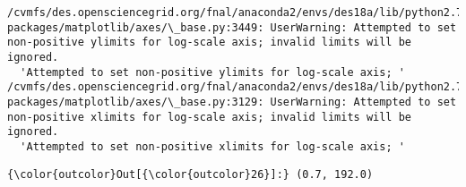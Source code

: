 \documentclass[11pt]{article}
\begin{document}
    \begin{Verbatim}[commandchars=\\\{\}]
/cvmfs/des.opensciencegrid.org/fnal/anaconda2/envs/des18a/lib/python2.7/site-packages/matplotlib/axes/\_base.py:3449: UserWarning: Attempted to set non-positive ylimits for log-scale axis; invalid limits will be ignored.
  'Attempted to set non-positive ylimits for log-scale axis; '
/cvmfs/des.opensciencegrid.org/fnal/anaconda2/envs/des18a/lib/python2.7/site-packages/matplotlib/axes/\_base.py:3129: UserWarning: Attempted to set non-positive xlimits for log-scale axis; invalid limits will be ignored.
  'Attempted to set non-positive xlimits for log-scale axis; '

    \end{Verbatim}

\begin{Verbatim}[commandchars=\\\{\}]
{\color{outcolor}Out[{\color{outcolor}26}]:} (0.7, 192.0)
\end{Verbatim}
            
    \begin{center}
    \end{center}
    { \hspace*{\fill} \\}
    
\end{document}
